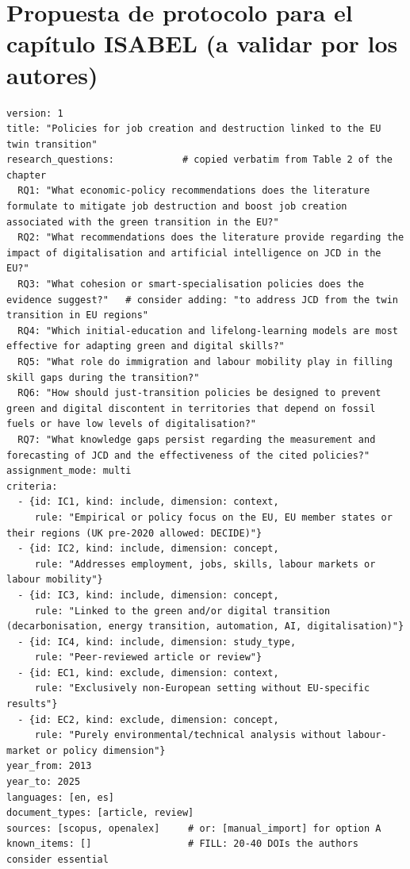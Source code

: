 \documentclass[11pt,a4paper]{article}
\begin{document}
\section{Propuesta de protocolo para el capítulo ISABEL (a validar por los autores)}\label{app:protocol}
\begin{lstlisting}
version: 1
title: "Policies for job creation and destruction linked to the EU twin transition"
research_questions:            # copied verbatim from Table 2 of the chapter
  RQ1: "What economic-policy recommendations does the literature formulate to mitigate job destruction and boost job creation associated with the green transition in the EU?"
  RQ2: "What recommendations does the literature provide regarding the impact of digitalisation and artificial intelligence on JCD in the EU?"
  RQ3: "What cohesion or smart-specialisation policies does the evidence suggest?"   # consider adding: "to address JCD from the twin transition in EU regions"
  RQ4: "Which initial-education and lifelong-learning models are most effective for adapting green and digital skills?"
  RQ5: "What role do immigration and labour mobility play in filling skill gaps during the transition?"
  RQ6: "How should just-transition policies be designed to prevent green and digital discontent in territories that depend on fossil fuels or have low levels of digitalisation?"
  RQ7: "What knowledge gaps persist regarding the measurement and forecasting of JCD and the effectiveness of the cited policies?"
assignment_mode: multi
criteria:
  - {id: IC1, kind: include, dimension: context,
     rule: "Empirical or policy focus on the EU, EU member states or their regions (UK pre-2020 allowed: DECIDE)"}
  - {id: IC2, kind: include, dimension: concept,
     rule: "Addresses employment, jobs, skills, labour markets or labour mobility"}
  - {id: IC3, kind: include, dimension: concept,
     rule: "Linked to the green and/or digital transition (decarbonisation, energy transition, automation, AI, digitalisation)"}
  - {id: IC4, kind: include, dimension: study_type,
     rule: "Peer-reviewed article or review"}
  - {id: EC1, kind: exclude, dimension: context,
     rule: "Exclusively non-European setting without EU-specific results"}
  - {id: EC2, kind: exclude, dimension: concept,
     rule: "Purely environmental/technical analysis without labour-market or policy dimension"}
year_from: 2013
year_to: 2025
languages: [en, es]
document_types: [article, review]
sources: [scopus, openalex]     # or: [manual_import] for option A
known_items: []                 # FILL: 20-40 DOIs the authors consider essential
\end{lstlisting}
\end{document}
